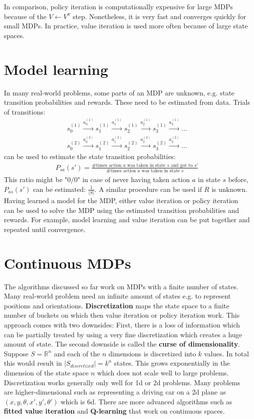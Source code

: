 \documentclass{report}
\begin{document}
In comparison, policy iteration is computationally expensive for large MDPs because of the $V\gets V^{\pi}$ step. Nonetheless, it is very fast and converges quickly for small MDPs. In practice, value iteration is used more often because of large state spaces.

\section{Model learning}
In many real-world problems, some parts of an MDP are unknown, e.g. state transition probabilities and rewards. These need to be estimated from data. Trials of transitions:
\begin{align*}
s_0^{(1)}\xrightarrow{a_0^{(1)}}s_1^{(1)}\xrightarrow{a_1^{(1)}}s_2^{(1)}\xrightarrow{a_2^{(1)}}s_3^{(1)}\xrightarrow{a_3^{(1)}}...
\end{align*}
\begin{align*}
s_0^{(2)}\xrightarrow{a_0^{(2)}}s_1^{(2)}\xrightarrow{a_1^{(2)}}s_2^{(2)}\xrightarrow{a_2^{(2)}}s_3^{(2)}\xrightarrow{a_3^{(2)}}...
\end{align*}
can be used to estimate the state transition probabilities:
\begin{align*}
P_{sa}(s')=\frac{\#\mbox{times action } a\mbox{ was taken in state } s \mbox{ and got to }s'} {\#\mbox{times action } a\mbox{ was taken in state } s}
\end{align*}
This ratio might be "$0/0$" in case of never having taken action $a$ in state $s$ before, $P_{as}(s')$ can be estimated: $\frac{1}{\vert S\vert}$. A similar procedure can be used if $R$ is unknown. \\
Having learned a model for the MDP, either value iteration or policy iteration can be used to solve the MDP using the estimated transition probabilities and rewards. For example, model learning and value iteration can be put together and repeated until convergence.

\section{Continuous MDPs}
The algorithms discussed so far work on MDPs with a finite number of states. Many real-world problem need an infinite amount of states e.g. to represent positions and orientations. {\bf Discretization} maps the state space to a finite number of buckets on which then value iteration or policy iteration work.
This approach comes with two downsides: First, there is a loss of information which can be partially treated by using a very fine discretization which creates a huge amount of state.
The second downside is called the {\bf curse of dimensionality}. Suppose $S=\mathbb{R}^n$ and each of the $n$ dimensions is discretized into $k$ values. In total this would result in $\vert S_{discretized}\vert=k^n$ states.
This grows exponentially in the dimension of the state space $n$ which does not scale well to large problems. Discretization works generally only well for 1d or 2d problems. Many problems are higher-dimensional such as representing a driving car on a 2d plane as $(x, y, \theta, x', y', \theta')$ which is 6d. There are more advanced algorithms such as {\bf fitted value iteration} and {\bf Q-learning} that work on continuous spaces.
\end{document}
